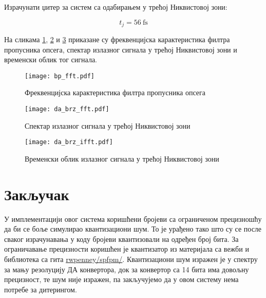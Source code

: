 \documentclass[conference]{IEEEJERM}
\begin{document}
Израчунати џитер за систем са одабирањем у трећој Никвистовој зони:

\begin{equation}
t_{j} = \SI{56}{\femto\second}
\end{equation}

На сликама \ref{fig:bp_fft}, \ref{fig:da_brz_fft} и \ref{fig:da_brz_ifft} приказане су фреквенцијска карактеристика филтра пропусника опсега,
спектар излазног сигнала у трећој Никвистовој зони и временски облик тог сигнала.

\begin{figure}[t]
	\centering
	\texttt{[image: bp\_fft.pdf]}
	\caption{Фреквенцијска карактеристика филтра пропусника опсега}
	\label{fig:bp_fft}
\end{figure}

\begin{figure}[t]
	\centering
	\texttt{[image: da\_brz\_fft.pdf]}
	\caption{Спектар излазног сигнала у трећој Никвистовој зони}
	\label{fig:da_brz_fft}
\end{figure}

\begin{figure}[t]
	\centering
	\texttt{[image: da\_brz\_ifft.pdf]}
	\caption{Временски облик излазног сигнала у трећој Никвистовој зони}
	\label{fig:da_brz_ifft}
\end{figure}



\section{Закључак}


У имплементацији овог система коришћени бројеви са ограниченом прецизношћу да би се боље симулирао квантизациони шум.
То је урађено тако што су се после сваког израчунавања у коду бројеви квантизовали на одређен број бита.
За ограничавање прецизности коришћен је квантизатор из материјала са вежби и библиотека са гита \href{https://github.com/rwpenney/spfpm/}{rwpenney/spfpm/}.
Квантизациони шум изражен је у спектру за мању резолуцију ДА конвертора, док за конвертор са 14 бита има довољну прецизност, те шум није изражен,
па закључујемо да у овом систему нема потребе за дитерингом. 
\end{document}
